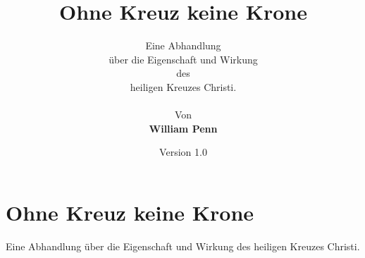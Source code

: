 \documentclass[a5paper,pagesize,10pt]{scrbook}
\begin{document}
\author{
Eine Abhandlung \\
über die Eigenschaft und Wirkung
\\
des
\\
heiligen Kreuzes Christi.
\\
\\
Von
\\
\textbf{William Penn}
}

\title{Ohne Kreuz keine Krone}
\date{Version 1.0}

\maketitle

\frontmatter

\tableofcontents




\mainmatter
\part{Ohne Kreuz keine Krone}
Eine Abhandlung über die Eigenschaft und Wirkung des
heiligen Kreuzes Christi.





















\backmatter
\printindex
\end{document}

